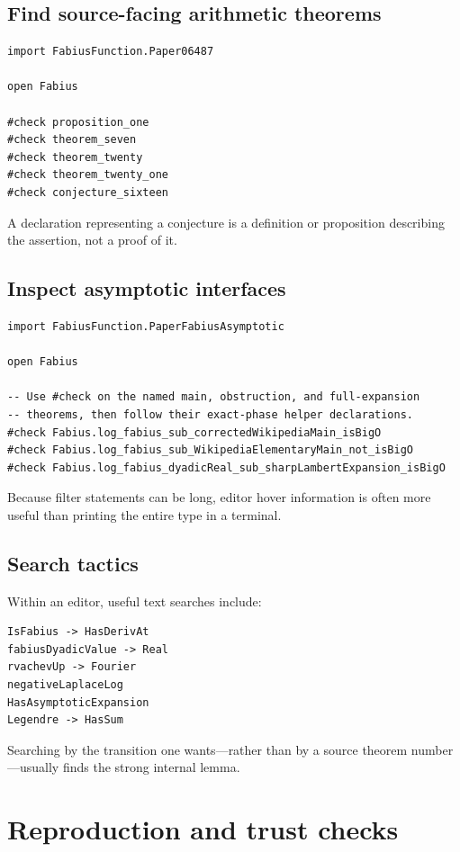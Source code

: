 \documentclass[11pt,oneside]{article}
\theoremstyle{definition}
\theoremstyle{remark}
\begin{document}
\newpage
\subsection{Find source-facing arithmetic theorems}
\begin{lstlisting}[style=pseudo]
import FabiusFunction.Paper06487

open Fabius

#check proposition_one
#check theorem_seven
#check theorem_twenty
#check theorem_twenty_one
#check conjecture_sixteen
\end{lstlisting}
A declaration representing a conjecture is a definition or proposition describing the assertion, not a proof of it.

\subsection{Inspect asymptotic interfaces}
\begin{lstlisting}[style=pseudo]
import FabiusFunction.PaperFabiusAsymptotic

open Fabius

-- Use #check on the named main, obstruction, and full-expansion
-- theorems, then follow their exact-phase helper declarations.
#check Fabius.log_fabius_sub_correctedWikipediaMain_isBigO
#check Fabius.log_fabius_sub_WikipediaElementaryMain_not_isBigO
#check Fabius.log_fabius_dyadicReal_sub_sharpLambertExpansion_isBigO
\end{lstlisting}
Because filter statements can be long, editor hover information is often more useful than printing the entire type in a terminal.

\newpage
\subsection{Search tactics}
Within an editor, useful text searches include:
\begin{lstlisting}[style=pseudo]
IsFabius -> HasDerivAt
fabiusDyadicValue -> Real
rvachevUp -> Fourier
negativeLaplaceLog
HasAsymptoticExpansion
Legendre -> HasSum
\end{lstlisting}
Searching by the transition one wants---rather than by a source theorem number---usually finds the strong internal lemma.

\section{Reproduction and trust checks}\label{app:reproduction}
\end{document}
